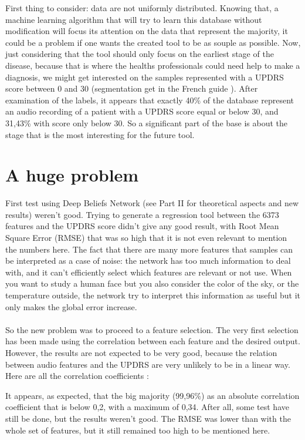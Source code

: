 \documentclass{report}
\begin{document}
		First thing to consider: data are not uniformly distributed. Knowing that, a machine learning algorithm that will try to learn this database without modification will focus its attention on the data that represent the majority, it could be a problem if one wants the created tool to be as souple as possible. Now, just considering that the tool should only focus on the earliest stage of the disease, because that is where the healths professionals could need help to make a diagnosis, we might get interested on the samples represented with a UPDRS score between 0 and 30 (segmentation get in the French guide \cite{huang2007hybrid}). After examination of the labels, it appears that exactly 40\% of the database represent an audio recording of a patient with a UPDRS score equal or below 30, and 31,43\% with score only below 30. So a significant part of the base is about the stage that is the most interesting for the future tool.
		
		\section{A huge problem}
		
		First test using Deep Beliefs Network (see Part II for theoretical aspects and new results) weren't good. Trying to generate a regression tool between the 6373 features and the UPDRS score didn't give any good result, with Root Mean Square Error (RMSE) that was so high that it is not even relevant to mention the numbers here. The fact that there are many more features that samples can be interpreted as a case of noise: the network has too much information to deal with, and it can't efficiently select which features are relevant or not use. When you want to study a human face but you also consider the color of the sky, or the temperature outside, the network try to interpret this information as useful but it only makes the global error increase.\\\\
		So the new problem was to proceed to a feature selection. The very first selection has been made using the correlation between each feature and the desired output. However, the results are not expected to be very good, because the relation between audio features and the UPDRS are very unlikely to be in a linear way. Here are all the correlation coefficients :
		
		
		It appears, as expected, that the big majority (99,96\%) as an absolute correlation coefficient that is below 0,2, with a maximum of 0,34. After all, some test have still be done, but the results weren't good. The RMSE was lower than with the whole set of features, but it still remained too high to be mentioned here.
		
\end{document}
